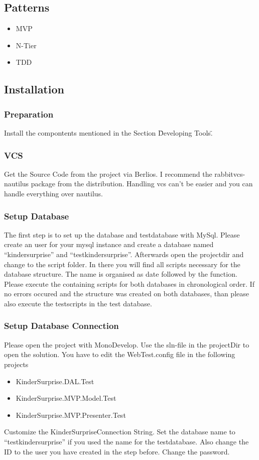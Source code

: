 \documentclass{article}
\begin{document}
\subsection{Patterns}
\begin{itemize}
  \item MVP
  \item N-Tier
  \item TDD
\end{itemize}

\subsection{Installation}

\subsubsection{Preparation}

Install the compontents mentioned in the Section \"Developing Tools\".

\subsubsection{VCS}

Get the Source Code from the project via Berlios.
I recommend the rabbitvcs-nautilus package from the distribution. Handling vcs
can't be easier and you can handle everything over nautilus.

\subsubsection{Setup Database}
The first step is to set up the database and testdatabase with MySql.
Please create an user for your mysql instance and create a database named
``kindersurprise'' and ``testkindersurprise''.
Afterwards open the projectdir and change to the script folder.
In there you will find all scripts necessary for the database structure. The
name is organised as date followed by the function.
Please execute the containing scripts for both databases in chronological order.
If no errors occured and the structure was created on both databases, than
please also execute the testscripts in the test database.

\subsubsection{Setup Database Connection}
Please open the project with MonoDevelop. Use the sln-file in the projectDir to
open the solution.
You have to edit the WebTest.config file in the following projects
\begin{itemize}
  \item KinderSurprise.DAL.Test
  \item KinderSurprise.MVP.Model.Test
  \item KinderSurprise.MVP.Presenter.Test
\end{itemize}
Customize the KinderSurpriseConnection String. Set the database name to
``testkindersurprise'' if you used the name for the testdatabase. Also change
the ID to the user you have created in the step before. Change the password.\\
\end{document}
